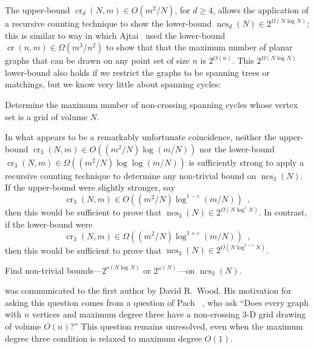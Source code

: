 \documentclass{patmorin}
\newcommand{\n}{N}
\DeclareMathOperator{\crs}{cr}
\DeclareMathOperator{\ncs}{ncs}
\begin{document}
The upper-bound $\crs_d(\n,m)\in O(m^2/\n)$, for $d\ge 4$, allows the
application of a recursive counting technique to show the lower-bound
$\ncs_d(\n)\in 2^{\Omega(\n\log\n)}$; this is similar to way in which Ajtai
\etal\ used the lower-bound $\crs(n,m)\in\Omega(m^3/n^2)$ to show that
that the maximum number of planar graphs that can be drawn on any point
set of size $n$ is $2^{O(n)}$.  This $2^{\Omega(\n\log\n)}$ lower-bound
also holds if we restrict the graphs to be spanning trees or matchings,
but we know very little about spanning cycles:

\begin{op}
  Determine the maximum number of non-crossing spanning cycles whose
  vertex set is a grid of volume $\n$.
\end{op}

In what appears to be a remarkably unfortunate coincidence, neither the
upper-bound $\crs_3(\n,m)\in O((m^2/\n)\log (m/\n))$ nor the lower-bound
$\crs_3(\n,m)\in \Omega((m^2/\n)\log\log(m/\n))$ is sufficiently strong
to apply a recursive counting technique to determine any non-trivial
bound on $\ncs_3(\n)$.  If the upper-bound were slightly stronger, say
\[
   \crs_3(\n,m)\in O((m^2/\n)\log^{1-\varepsilon}(m/\n)) \enspace ,
\]
then this would be sufficient to prove that
$\ncs_3(\n)\in2^{\Omega(\n\log^{\varepsilon}\n)}$.  In contrast, if the
lower-bound were
\[
  \crs_3(\n,m)\in \Omega((m^2/\n)\log^{1+\varepsilon}(m/\n)) \enspace ,
\]
then this would be sufficient to prove that
$\ncs_3(\n)\in2^{O(\n\log^{1-\varepsilon}\n)}$.

\begin{op}[Wood]
  Find non-trivial bounds---$2^{o(\n\log\n)}$ or $2^{\omega(\n)}$---on
  $\ncs_3(\n)$.
\end{op}

 was communicated to the first author by David R.\
Wood.  His motivation for asking this question comes from a question of
Pach \etal~\cite{pach.thiele.ea:three-dimensional}, who ask ``Does every
graph with $n$ vertices and maximum degree three have a non-crossing
3-D grid drawing of volume $O(n)$?''  This question remains unresolved,
even when the maximum degree three condition is relaxed to maximum
degree $O(1)$.
\end{document}
